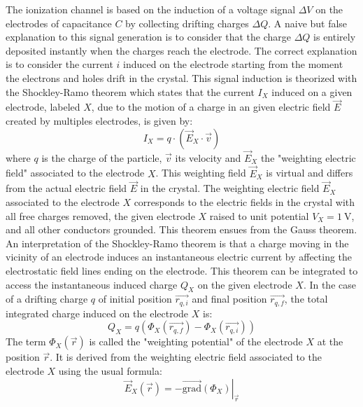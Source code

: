 The ionization channel is based on the induction of a voltage signal $\Delta V$ on the electrodes  of capacitance $C$ by collecting drifting charges $\Delta Q$. A naive but false explanation to this signal generation is to consider that the charge $\Delta Q$ is entirely deposited instantly when the charges reach the electrode. The correct explanation is to consider the current $i$ induced on the electrode starting from the moment the electrons and holes drift in the crystal. This signal induction is theorized with the Shockley-Ramo theorem which states that the current $I_X$ induced on a given electrode, labeled $X$, due to the motion of a charge in an given electric field $\vec{E}$ created by multiples electrodes, is given by:
\begin{equation}
I_X = q \cdot \left( \vec{E}_X \cdot \vec{v} \right)
\end{equation}
where $q$ is the charge of the particle, $\vec{v}$ its velocity and $\vec{E}_X$ the "weighting electric field" associated to the electrode $X$. This weighting field $\vec{E}_X$ is virtual and differs from the actual electric field $\vec{E}$ in the crystal. The weighting electric field $\vec{E}_X$ associated to the electrode $X$ corresponds to the electric fields in the crystal with all free charges removed, the given electrode $X$ raised to unit potential $V_X = \SI{1}{\volt}$, and all other conductors grounded. This theorem ensues from the Gauss theorem.
An interpretation of the Shockley-Ramo theorem is that a charge moving in the vicinity of an electrode induces an instantaneous electric current by affecting the electrostatic field lines ending on the electrode.
This theorem can be integrated to access the instantaneous induced charge $Q_X$ on the given electrode $X$. In the case of a drifting charge $q$ of initial position $\vec{r_{q,i}}$ and final position $\vec{r_{q,f}}$, the total integrated charge induced on the electrode $X$ is:
\begin{equation}
Q_X = q \left( \Phi_X (\vec{r_{q,f}}) - \Phi_X (\vec{r_{q,i}}) \right)
\end{equation}
The term $\Phi_X(\vec{r})$ is called the "weighting potential" of the electrode $X$ at the position $\vec{r}$. It is derived from the weighting electric field associated to the electrode $X$ using the usual formula:
\begin{equation}
\vec{E}_X (\vec{r}) = - \left. \overrightarrow{\mathrm{grad}} \left(  \Phi_X \right)  \right|_{\vec{r}}
\end{equation}
